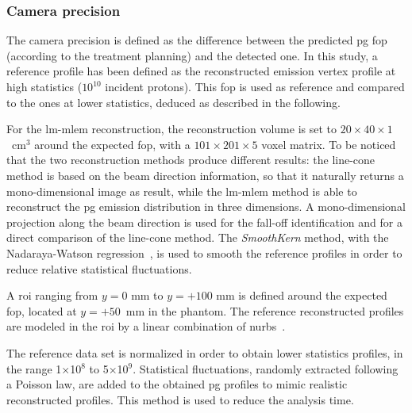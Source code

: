 \subsubsection{Camera precision}\label{chap4::subsubsec::MatMeth:precision}

The camera precision is defined as the difference between the predicted \gls{pg} \gls{fop} (according to the treatment planning) and the detected one.
In this study, a reference profile has been defined as the reconstructed emission vertex profile at high statistics ($\mathrm{10^{10}}$ incident protons). This \gls{fop} is used as reference and compared to the ones at lower statistics, deduced as described in the following.

For the \gls{lm-mlem} reconstruction, the reconstruction volume is set to $20\times40\times1$~cm$^3$ around the expected \gls{fop}, with a $101\times201\times5$ voxel matrix. To be noticed that the two reconstruction methods produce different results: the line-cone method is based on the beam direction information, so that it naturally returns a mono-dimensional image as result, while the \gls{lm-mlem} method is able to reconstruct the \gls{pg} emission distribution in three dimensions. A mono-dimensional projection along the beam direction is used for the fall-off identification and for a direct comparison of the line-cone method.
The \textit{SmoothKern} method, with the Nadaraya-Watson regression~\parencite{Nadaraya1964, Watson1964}, is used to smooth the reference profiles in order to reduce relative statistical fluctuations.

A \gls{roi} ranging from $y=0$ mm to $y=+100$ mm is defined around the expected \gls{fop}, located at $y=+50$~mm in the phantom. The reference reconstructed profiles are modeled in the \gls{roi} by a linear combination of \gls{nurbs}~\parencite{Rogers2001}. 

The reference data set is normalized in order to obtain lower statistics profiles, in the range 1$\times$10$^8$ to 5$\times$10$^9$. Statistical fluctuations, randomly extracted following a Poisson law, are added to the obtained \gls{pg} profiles to mimic realistic reconstructed profiles. This method is used to reduce the analysis time.

